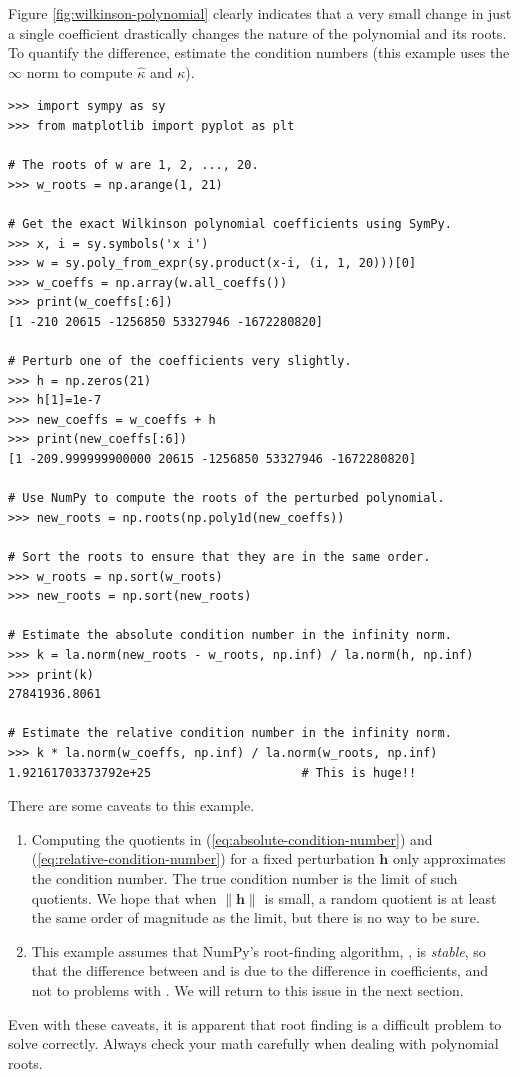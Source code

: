 Figure \ref{fig:wilkinson-polynomial} clearly indicates that a very small change in just a single coefficient drastically changes the nature of the polynomial and its roots.
To quantify the difference, estimate the condition numbers (this example uses the $\infty$ norm to compute $\hat{\kappa}$ and $\kappa$).

\begin{lstlisting}
>>> import sympy as sy
>>> from matplotlib import pyplot as plt

# The roots of w are 1, 2, ..., 20.
>>> w_roots = np.arange(1, 21)

# Get the exact Wilkinson polynomial coefficients using SymPy.
>>> x, i = sy.symbols('x i')
>>> w = sy.poly_from_expr(sy.product(x-i, (i, 1, 20)))[0]
>>> w_coeffs = np.array(w.all_coeffs())
>>> print(w_coeffs[:6])
[1 -210 20615 -1256850 53327946 -1672280820]

# Perturb one of the coefficients very slightly.
>>> h = np.zeros(21)
>>> h[1]=1e-7
>>> new_coeffs = w_coeffs + h
>>> print(new_coeffs[:6])
[1 -209.999999900000 20615 -1256850 53327946 -1672280820]

# Use NumPy to compute the roots of the perturbed polynomial.
>>> new_roots = np.roots(np.poly1d(new_coeffs))

# Sort the roots to ensure that they are in the same order.
>>> w_roots = np.sort(w_roots)
>>> new_roots = np.sort(new_roots)

# Estimate the absolute condition number in the infinity norm.
>>> k = la.norm(new_roots - w_roots, np.inf) / la.norm(h, np.inf)
>>> print(k)
27841936.8061

# Estimate the relative condition number in the infinity norm.
>>> k * la.norm(w_coeffs, np.inf) / la.norm(w_roots, np.inf)
1.92161703373792e+25                     # This is huge!!
\end{lstlisting}

There are some caveats to this example.
\begin{enumerate}
\item Computing the quotients in (\ref{eq:absolute-condition-number}) and (\ref{eq:relative-condition-number}) for a fixed perturbation $\mathbf{h}$ only approximates the condition number.
The true condition number is the limit of such quotients.
We hope that when $\|\mathbf{h}\|$ is small, a random quotient is at least the same order of magnitude as the limit, but there is no way to be sure.

\item This example assumes that NumPy's root-finding algorithm, , is \emph{stable}, so that the difference between  and  is due to the difference in coefficients, and not to problems with .
We will return to this issue in the next section.
\end{enumerate}
Even with these caveats, it is apparent that root finding is a difficult problem to solve correctly.
Always check your math carefully when dealing with polynomial roots.

